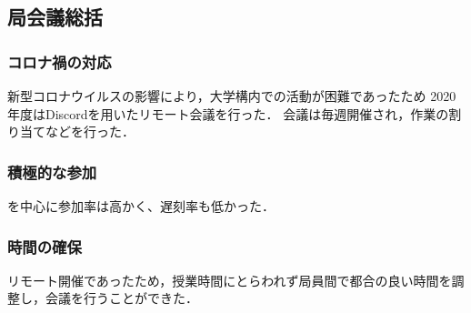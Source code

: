 \subsection*{局会議総括}

\subsubsection*{コロナ禍の対応}

新型コロナウイルスの影響により，大学構内での活動が困難であったため
2020年度はDiscordを用いたリモート会議を行った．
会議は毎週開催され，作業の割り当てなどを行った．

\subsubsection*{積極的な参加}

\secondGrade{}を中心に参加率は高かく、遅刻率も低かった．

\subsubsection*{時間の確保}

リモート開催であったため，授業時間にとらわれず局員間で都合の良い時間を調整し，会議を行うことができた．
